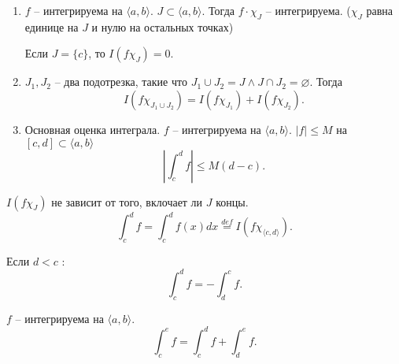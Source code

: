 \documentclass[11pt]{book}
\begin{document}
\begin{prop}
\begin{enumerate}
\begin{proof}
		Получаем \[
		    \begin{array}{c}
			\slim_{J \in  \Sigma} |J| osc_J f \le  \varepsilon \\
			\slim_{J \in  \Sigma} |J| osc_J g \le  \varepsilon
		    \end{array}
		.\]
		Тогда $ \forall  J \in  \Sigma: osc_J (f g) \le  C \cdot osc_J g + D \cdot osc_J f$.

		Следовательно, \[
		    \slim_{J \in  \Sigma} |J| \cdot osc_J fg \le C \cdot \slim_J |J| \cdot osc_J g + D \cdot \slim_J | J| \cdot osc_J f \le  (C + D ) \varepsilon
		.\]
	    \end{proof}
	\item
	    $ f$ -- интегрируема на $ \langle a, b \rangle$. $ J \subset  \langle a, b \rangle$.
	    Тогда $ f \cdot \chi_J $ -- интегрируема. ($ \chi_J$ равна единице на  $ J$ и нулю на остальных точках)

	    Если $ J = \{c\}$, то $ I(f \chi_J)  = 0$.
	\item $ J_1, J_2$ -- два подотрезка, такие что $ J_1 \cup  J_2 = J \wedge J \cap  J_2 = \varnothing$. Тогда
	    \[
		I(f \chi_{J_1 \cup J_2}) = I(f \chi_{J_1}) + I(f \chi _{J_2})
	    .\]
	\item Основная оценка интеграла.
	    $ f$ -- интегрируема на $ \langle a, b \rangle$.
	    $ |f | \le M$ на $ [c, d] \subset \langle a, b \rangle$
	    \[
		\left| \int_c ^{ d} f \right| \le  M(d-c)
	    .\]
    \end{enumerate}
\end{prop}
\begin{name}
    $ I(f \chi_J)$ не зависит от того, вклочает ли $ J$ концы.
    \[
	\int_c^{d} f  =  \int_c^{d} f(x) dx\stackrel{def} =  I(f \chi _ {\langle c, d \rangle})
    .\]
\end{name}
\begin{name}
    Если $ d < c$ :
    \[
	\int_c^{d} f = - \int_d ^{c} f
    .\]
\end{name}
\begin{st}
    $ f$ -- интегрируема на $ \langle a, b \rangle$.
    \[
	\int_c ^{e} f = \int _c^{ d} f+ \int_d ^{e} f
    .\]
\end{st}
\end{document}
